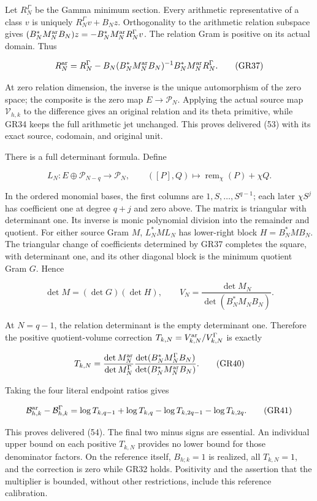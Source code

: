Let \(R_N^\Gamma\) be the Gamma minimum section. Every arithmetic representative of a class \(v\) is uniquely \(R_N^\Gamma v+B_Nz\). Orthogonality to the arithmetic relation subspace gives \((B_N^*M_N^{\rm ar}B_N)z=-B_N^*M_N^{\rm ar}R_N^\Gamma v\). The relation Gram is positive on its actual domain. Thus

\[
R_N^{\rm ar}
=R_N^\Gamma-
B_N(B_N^*M_N^{\rm ar}B_N)^{-1}B_N^*M_N^{\rm ar}R_N^\Gamma.
\tag{GR37}
\]

At zero relation dimension, the inverse is the unique automorphism of the zero space; the composite is the zero map \(E\to\mathcal P_N\). Applying the actual source map \(\mathcal V_{h,k}\) to the difference gives an original relation and its theta primitive, while GR34 keeps the full arithmetic jet unchanged. This proves delivered (53) with its exact source, codomain, and original unit.

There is a full determinant formula. Define

\[
L_N:E\oplus\mathcal P_{N-q}\longrightarrow\mathcal P_N,\qquad
([P],Q)\longmapsto\operatorname{rem}_\chi(P)+\chi Q.
\tag{GR38}
\]

In the ordered monomial bases, the first columns are \(1,S,\ldots,S^{q-1}\); each later \(\chi S^j\) has coefficient one at degree \(q+j\) and zero above. The matrix is triangular with determinant one. Its inverse is monic polynomial division into the remainder and quotient. For either source Gram \(M\), \(L_N^*ML_N\) has lower-right block \(H=B_N^*MB_N\). The triangular change of coefficients determined by GR37 completes the square, with determinant one, and its other diagonal block is the minimum quotient Gram \(G\). Hence

\[
\det M=(\det G)(\det H),\qquad
V_N=\frac{\det M_N}{\det(B_N^*M_NB_N)}.
\tag{GR39}
\]

At \(N=q-1\), the relation determinant is the empty determinant one. Therefore the positive quotient-volume correction \(T_{k,N}=V_{k,N}^{\rm ar}/V_{k,N}^\Gamma\) is exactly

\[
T_{k,N}=
\frac{\det M_N^{\rm ar}}{\det M_N^\Gamma}
\frac{\det(B_N^*M_N^\Gamma B_N)}
{\det(B_N^*M_N^{\rm ar}B_N)}.
\tag{GR40}
\]

Taking the four literal endpoint ratios gives

\[
\mathcal B_{h,k}^{\rm ar}-\mathcal B_{h,k}^\Gamma
=\log T_{k,q-1}+\log T_{k,q}
-\log T_{k,2q-1}-\log T_{k,2q}.
\tag{GR41}
\]

This proves delivered (54). The final two minus signs are essential. An individual upper bound on each positive \(T_{k,N}\) provides no lower bound for those denominator factors. On the reference itself, \(B_{h;k}=1\) is realized, all \(T_{k,N}=1\), and the correction is zero while GR32 holds. Positivity and the assertion that the multiplier is bounded, without other restrictions, include this reference calibration.

